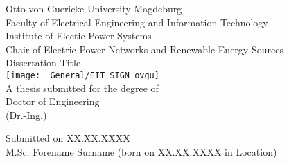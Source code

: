 %
\begin{titlepage}
    \begin{center}
        \normalsize
        Otto von Guericke University Magdeburg \\
        Faculty of Electrical Engineering and Information Technology \\
        Institute of Electic Power Systems \\
        Chair of Electric Power Networks and Renewable Energy Sources\\
        \vspace{1cm} %
        \huge
        Dissertation Title \\
        \vspace{1.5cm} %
        \texttt{[image: \_General/EIT\_SIGN\_ovgu]} \\
        \vspace{1cm} %
   	\normalsize	
   	A thesis submitted for the degree of \\
   	\vspace{1cm} %
        \Large
        Doctor of Engineering \\
        (Dr.-Ing.) \\
        \vspace{1cm} %
   \end{center}
    \vfill    
    \normalsize
    Submitted on XX.XX.XXXX \\
    M.Sc. Forename Surname (born on XX.XX.XXXX in Location) \\
\end{titlepage}
